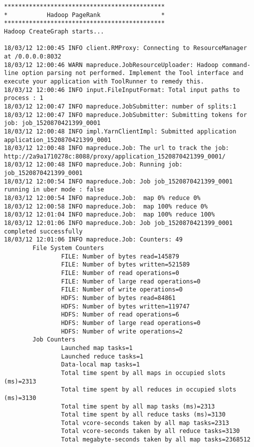 \begin{lstlisting}
*********************************************
*           Hadoop PageRank                 *
*********************************************
Hadoop CreateGraph starts...

18/03/12 12:00:45 INFO client.RMProxy: Connecting to ResourceManager at /0.0.0.0:8032
18/03/12 12:00:46 WARN mapreduce.JobResourceUploader: Hadoop command-line option parsing not performed. Implement the Tool interface and execute your application with ToolRunner to remedy this.
18/03/12 12:00:46 INFO input.FileInputFormat: Total input paths to process : 1
18/03/12 12:00:47 INFO mapreduce.JobSubmitter: number of splits:1
18/03/12 12:00:47 INFO mapreduce.JobSubmitter: Submitting tokens for job: job_1520870421399_0001
18/03/12 12:00:48 INFO impl.YarnClientImpl: Submitted application application_1520870421399_0001
18/03/12 12:00:48 INFO mapreduce.Job: The url to track the job: http://2a9a1710278c:8088/proxy/application_1520870421399_0001/
18/03/12 12:00:48 INFO mapreduce.Job: Running job: job_1520870421399_0001
18/03/12 12:00:54 INFO mapreduce.Job: Job job_1520870421399_0001 running in uber mode : false
18/03/12 12:00:54 INFO mapreduce.Job:  map 0% reduce 0%
18/03/12 12:00:58 INFO mapreduce.Job:  map 100% reduce 0%
18/03/12 12:01:04 INFO mapreduce.Job:  map 100% reduce 100%
18/03/12 12:01:06 INFO mapreduce.Job: Job job_1520870421399_0001 completed successfully
18/03/12 12:01:06 INFO mapreduce.Job: Counters: 49
        File System Counters
                FILE: Number of bytes read=145879
                FILE: Number of bytes written=521589
                FILE: Number of read operations=0
                FILE: Number of large read operations=0
                FILE: Number of write operations=0
                HDFS: Number of bytes read=84861
                HDFS: Number of bytes written=119747
                HDFS: Number of read operations=6
                HDFS: Number of large read operations=0
                HDFS: Number of write operations=2
        Job Counters
                Launched map tasks=1
                Launched reduce tasks=1
                Data-local map tasks=1
                Total time spent by all maps in occupied slots (ms)=2313
                Total time spent by all reduces in occupied slots (ms)=3130
                Total time spent by all map tasks (ms)=2313
                Total time spent by all reduce tasks (ms)=3130
                Total vcore-seconds taken by all map tasks=2313
                Total vcore-seconds taken by all reduce tasks=3130
                Total megabyte-seconds taken by all map tasks=2368512

\end{lstlisting}
